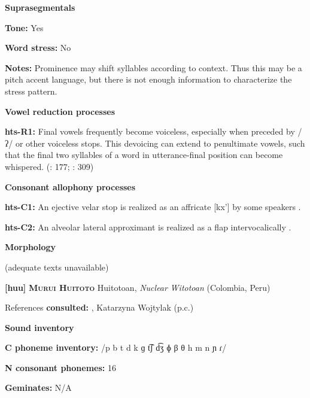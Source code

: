 \textbf{Suprasegmentals}



\textbf{Tone:} Yes



\textbf{Word stress:} No



\textbf{Notes:} Prominence may shift syllables according to context. Thus this may be a pitch accent language, but there is not enough information to characterize the stress pattern.



\textbf{Vowel reduction processes}



\textbf{hts-R1:} Final vowels frequently become voiceless, especially when preceded by /ʔ/ or other voiceless stops. This devoicing can extend to penultimate vowels, such that the final two syllables of a word in utterance-final position can become whispered. (\citealt{SandsEtAl1996}: 177; \citealt{TuckerEtAl1977}: 309)



\textbf{Consonant allophony processes}



\textbf{hts-C1:} An ejective velar stop is realized as an affricate [kx’] by some speakers \citep[41]{Sands2013}.



\textbf{hts-C2:} An alveolar lateral approximant is realized as a flap intervocalically \citep[41]{Sands2013}.



\textbf{Morphology}



(adequate texts unavailable)



\textbf{[huu]}   \textbf{\textsc{Murui Huitoto}  }  Huitotoan, \textit{Nuclear} \textit{Witotoan} (Colombia, Peru)



References \textbf{consulted:} \citet{Wojtylak2017}, Katarzyna Wojtylak (p.c.)



\textbf{Sound inventory}



\textbf{C phoneme inventory:} /p b t d k ɡ t͡ʃ d͡ʒ ɸ β θ h m n ɲ ɾ/



\textbf{N consonant phonemes:} 16



\textbf{Geminates:} N/A



